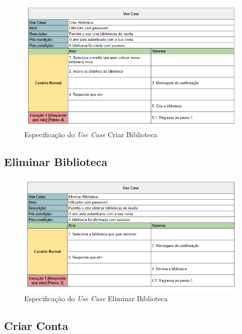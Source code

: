 \documentclass[a4paper]{report}
\begin{document}
\begin{figure}[H]
	\centering 
    \includegraphics[width=\textwidth]{images/Criar_Biblioteca.png}  
    \caption{Especificação do \emph{Use Case} Criar Biblioteca}
\end{figure}

\subsection{Eliminar Biblioteca}

\begin{figure}[H]
	\centering 
    \includegraphics[width=\textwidth]{images/Eliminar_Biblioteca.png}  
    \caption{Especificação do \emph{Use Case} Eliminar Biblioteca}
\end{figure}

\subsection{Criar Conta}
\end{document}
